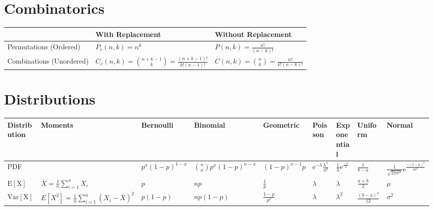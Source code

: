 \documentclass[8pt]{extarticle}
\begin{document}
\section{Combinatorics}

\begin{center}
    \begin{tabular}{ | l | l | l | }
        \hline
        & With Replacement & Without Replacement \\ \hline

        Permutations (Ordered)   & $P_{r}(n,k)=n^k$              & $P(n,k)=\frac{n!}{(n-k)!}$ \\ \hline
        Combinations (Unordered) & $C_{r}(n,k)=\binom{n+k-1}{k}=\frac{(n+k-1)!}{k!(n-1)!}$ & $C(n,k)=\binom{n}{k}=\frac{n!}{k!(n-k)!}$ \\ \hline
    \end{tabular}
\end{center}

\section{Distributions}

\begin{center}
    \begin{tabular}{ | l || l || l | l | l | l || l | l | l | }
    \hline
    Distribution & Moments & Bernoulli & Binomial & Geometric & Poisson & Exponential & Uniform & Normal \\ \hline

    PDF & 
        & $p^x(1-p)^{1-x}$ 
        & $\binom{n}{x}p^x(1-p)^{n-x}$
        & $(1-p)^{x-1}p$ 
        & $\mathrm{e}^{-\lambda}\frac{\lambda^x}{x!}$
        & $\frac{1}{\lambda}\mathrm{e}^{\frac{-x}{\lambda}}$ 
        & $\frac{1}{b-a}$ 
        & $\frac{1}{\sqrt{2\pi\sigma^2}}\mathrm{e}^{\frac{-(x-\mu)^2}{2\sigma^2}}$ \\ \hline

    $\mathrm{E[X]}$ & $\bar{X} = \frac{1}{n}\displaystyle\sum_{i=1}^{n} X_i$
                    & $p$ 
                    & $np$ 
                    & $\frac{1}{p}$ 
                    & $\lambda$ 
                    & $\lambda$ 
                    & $\frac{a+b}{2}$
                    & $\mu$ \\ \hline

    $\mathrm{Var[X]}$ & $E[X^2] = \frac{1}{n}\displaystyle\sum_{i=1}^{n} (X_i - \bar{X})^2$
                      & $p(1-p)$
                      & $np(1-p)$
                      & $\frac{1-p}{p^2}$ 
                      & $\lambda$
                      & $\lambda^2$
                      & $\frac{(b-a)^2}{12}$
                      & $\sigma^2$ \\ \hline
    \end{tabular}
\end{center}
\end{document}
